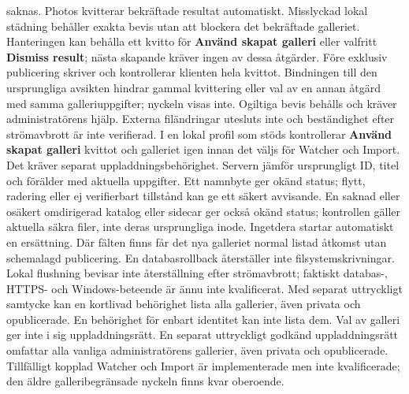 \documentclass[11pt,a4paper]{article}
\newcommand{\ui}[1]{\textbf{#1}}
\begin{document}
saknas.
Photos kvitterar bekräftade resultat automatiskt. Misslyckad lokal städning
behåller exakta bevis utan att blockera det bekräftade galleriet. Hanteringen
kan behålla ett kvitto för \ui{Använd skapat galleri} eller valfritt
\ui{Dismiss result}; nästa skapande kräver ingen av dessa åtgärder.
Före exklusiv publicering skriver och kontrollerar klienten hela kvittot.
Bindningen till den ursprungliga avsikten hindrar gammal kvittering eller
val av en annan åtgärd med samma galleriuppgifter; nyckeln visas inte.
Ogiltiga bevis behålls och kräver administratörens hjälp.
Externa filändringar utesluts inte och beständighet
efter strömavbrott är inte verifierad. I en lokal profil som stöds
kontrollerar \ui{Använd skapat galleri} kvittot och galleriet igen innan det
väljs för Watcher och Import. Det kräver separat uppladdningsbehörighet.
Servern jämför ursprungligt ID, titel och förälder med aktuella uppgifter.
Ett namnbyte ger okänd status; flytt, radering eller ej verifierbart tillstånd
kan ge ett säkert avvisande. En saknad eller osäkert omdirigerad katalog eller
sidecar ger också okänd status; kontrollen gäller aktuella säkra filer, inte
deras ursprungliga inode. Ingetdera startar automatiskt en ersättning. Där fälten
finns får det nya galleriet normal listad åtkomst utan schemalagd publicering. En
databasrollback återställer inte filsystemskrivningar.
Lokal flushning bevisar inte återställning efter strömavbrott; faktiskt databas-,
HTTPS- och Windows-beteende är ännu inte kvalificerat.
Med separat uttryckligt samtycke kan en kortlivad
behörighet lista alla gallerier, även privata och opublicerade. En behörighet
för enbart identitet kan inte lista dem. Val av galleri ger inte i sig
uppladdningsrätt. En separat uttryckligt godkänd uppladdningsrätt omfattar alla
vanliga administratörens gallerier, även privata och opublicerade. Tillfälligt
kopplad Watcher och Import är implementerade men inte kvalificerade; den äldre
galleribegränsade nyckeln finns kvar oberoende.
\end{document}
